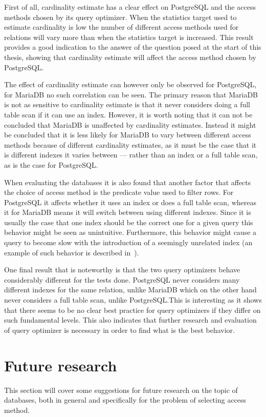 First of all, cardinality estimate has a clear effect on PostgreSQL and the
access methods chosen by its query optimizer. When the statistics target used to
estimate cardinality is low the number of different access methods used for
relations will vary more than when the statistics target is increased. This
result provides a good indication to the answer of the question posed at the
start of this thesis, showing that cardinality estimate will affect the access
method chosen by PostgreSQL.\@

The effect of cardinality estimate can however only be observed for PostgreSQL,
for MariaDB no such correlation can be seen. The primary reason that MariaDB is
not as sensitive to cardinality estimate is that it never considers doing a full
table scan if it can use an index. However, it is worth noting that it can not
be concluded that MariaDB is unaffected by cardinality estimates. Instead it
might be concluded that it is less likely for MariaDB to vary between different
access methods because of different cardinality estimates, as it must be the
case that it is different indexes it varies between --- rather than an index or
a full table scan, as is the case for PostgreSQL.\@

When evaluating the databases it is also found that another factor that affects
the choice of access method is the predicate value used to filter rows. For
PostgreSQL it affects whether it uses an index or does a full table scan,
whereas it for MariaDB means it will switch between using different indexes.
Since it is usually the case that one index should be the correct one for a
given query this behavior might be seen as unintuitive. Furthermore, this
behavior might cause a query to become slow with the introduction of a seemingly
unrelated index (an example of such behavior is described
in~\cite[Ch.~14]{lahdenmaki_2005_relational_rdidatodossea}).

One final result that is noteworthy is that the two query optimizers behave
considerably different for the tests done. PostgreSQL never considers
many different indexes for the same relation, unlike MariaDB which on the other
hand never considers a full table scan, unlike PostgreSQL.\@ This is interesting
as it shows that there seems to be no clear best practice for query optimizers
if they differ on such fundamental levels. This also indicates that further
research and evaluation of query optimizer is necessary in order to find what is
the best behavior.

\section{Future research}\label{sec:futureresearch}
This section will cover some suggestions for future research on the topic of
databases, both in general and specifically for the problem of selecting access method.

